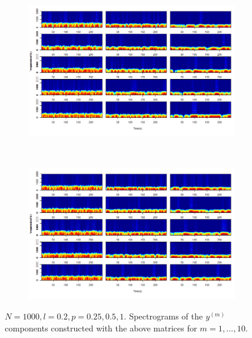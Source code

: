 \documentclass[11pt, a4paper]{article} %
\begin{document}
\begin{figure}[H]
\begin{subfigure}{1.1\textwidth}
  \centering
  \includegraphics[width=\linewidth]{spectro_N1000_l020_y_m_1_5.png}
  \label{fig:sfig1}
\end{subfigure}\\
\begin{subfigure}{1.1\textwidth}
  \centering
  \includegraphics[width=\linewidth]{spectro_N1000_l020_y_m_6_10.png}
  \label{fig:sfig2}
\end{subfigure}
\caption{$N = 1000, l = 0.2, p = 0.25, 0.5, 1$. Spectrograms of the $y^{(m)}$ components constructed with the above matrices for $m = 1, \dots, 10$.  }
\label{fig:fig}
\end{figure}

\restoregeometry



\end{document}
